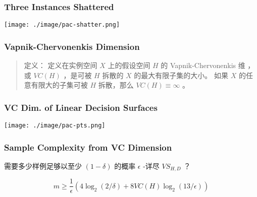 \documentclass{beamer}
\begin{document}
\begin{frame}
\frametitle{Three Instances Shattered}
\label{sec-4-10}


\texttt{[image: ./image/pac-shatter.png]}
\end{frame}
\begin{frame}
\frametitle{Vapnik-Chervonenkis Dimension}
\label{sec-4-11}


\begin{quote}
定义： 定义在实例空间 $X$ 上的假设空间 $H$ 的 Vapnik-Chervonenkis 维 ， 或 $VC(H)$ ，是可被 $H$ 拆散的 $X$ 的最大有限子集的大小。
如果 $X$ 的任意有限大的子集可被 $H$ 拆散，那么 $VC(H) \equiv \infty$ 。
\end{quote}
\end{frame}
\begin{frame}
\frametitle{VC Dim. of Linear Decision Surfaces}
\label{sec-4-12}


\texttt{[image: ./image/pac-pts.png]}
\end{frame}
\begin{frame}
\frametitle{Sample Complexity from VC Dimension}
\label{sec-4-13}


需要多少样例足够以至少 $(1 - \delta)$ 的概率 $\epsilon$ -详尽 $VS_{H,D}$ ？

$$m \geq \frac{1}{\epsilon}(4\log_2(2/\delta) + 8 VC(H) \log_2 (13/\epsilon))$$
\end{frame}
\end{document}
